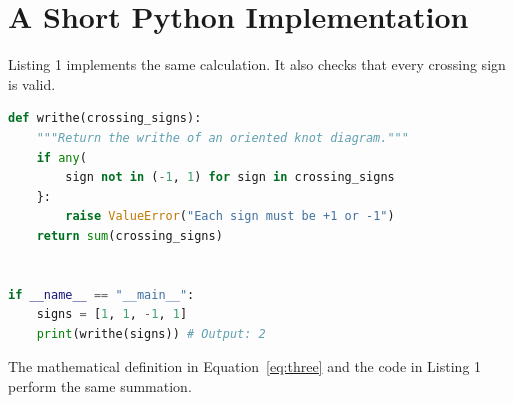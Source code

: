 \section{A Short Python Implementation}

Listing 1 implements the same calculation. It also checks
that every crossing sign is valid.

\begin{lstlisting}[language=Python, caption={Computing the writhe from signed crossings.}, label={lst:one}]
def writhe(crossing_signs):
    """Return the writhe of an oriented knot diagram."""
    if any(
        sign not in (-1, 1) for sign in crossing_signs
    }:
        raise ValueError("Each sign must be +1 or -1")
    return sum(crossing_signs)


if __name__ == "__main__":
    signs = [1, 1, -1, 1]
    print(writhe(signs)) # Output: 2
\end{lstlisting}

The mathematical definition in Equation~\ref{eq:three} and the
code in Listing 1 perform the same summation.